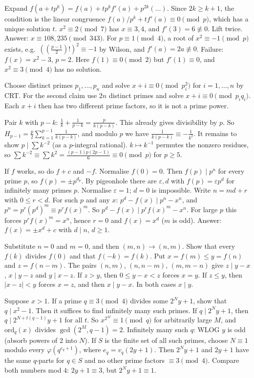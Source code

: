 \documentclass[11pt,a4paper]{article}
\begin{document}
 Expand $f(a+tp^k)=f(a)+tp^kf'(a)+p^{2k}(\dots)$. Since $2k\ge k+1$, the condition is the linear congruence $f(a)/p^k+tf'(a)\equiv0\pmod p$, which has a unique solution $t$.
 $x^2\equiv2\pmod 7$ has $x\equiv3,4$, and $f'(3)=6\not\equiv0$. Lift twice. Answer: $x\equiv108,235\pmod{343}$. For $p\equiv1\pmod 4$, a root of $x^2\equiv-1\pmod p$ exists, e.g.\ $((\frac{p-1}{2})!)^2\equiv-1$ by Wilson, and $f'(a)=2a\not\equiv0$.
 Failure: $f(x)=x^2-3$, $p=2$. Here $f(1)\equiv0\pmod 2$ but $f'(1)\equiv0$, and $x^2\equiv3\pmod 4$ has no solution.

 Choose distinct primes $p_1,\dots,p_n$ and solve $x+i\equiv0\pmod{p_i^2}$ for $i=1,\dots,n$ by CRT.
 For the second claim use $2n$ distinct primes and solve $x+i\equiv0\pmod{p_iq_i}$. Each $x+i$ then has two different prime factors, so it is not a prime power.

 Pair $k$ with $p-k$: $\frac1k+\frac1{p-k}=\frac{p}{k(p-k)}$. This already gives divisibility by $p$.
 So $H_{p-1}=\frac p2\sum_{k=1}^{p-1}\frac1{k(p-k)}$, and modulo $p$ we have $\frac1{k(p-k)}\equiv-\frac1{k^2}$. It remains to show $p\mid\sum k^{-2}$ (as a $p$-integral rational).
 $k\mapsto k^{-1}$ permutes the nonzero residues, so $\sum k^{-2}\equiv\sum k^2=\frac{(p-1)p(2p-1)}6\equiv0\pmod p$ for $p\ge5$.

 If $f$ works, so do $f+c$ and $-f$. Normalise $f(0)=0$. Then $f(p)\mid p^n$ for every prime $p$, so $f(p)=\pm p^{d_p}$.
 By pigeonhole there are $\varepsilon,d$ with $f(p)=\varepsilon p^d$ for infinitely many primes $p$. Normalise $\varepsilon=1$; $d=0$ is impossible. Write $n=md+r$ with $0\le r<d$.
 For such $p$ and any $x$: $p^d-f(x)\mid p^n-x^n$, and $p^n=p^r(p^d)^m\equiv p^rf(x)^m$. So $p^d-f(x)\mid p^rf(x)^m-x^n$. For large $p$ this forces $p^rf(x)^m=x^n$, hence $r=0$ and $f(x)=x^d$ ($m$ is odd). Answer: $f(x)=\pm x^d+c$ with $d\mid n$, $d\ge1$.

 Substitute $n=0$ and $m=0$, and then $(m,n)\to(n,m)$. Show that every $f(k)$ divides $f(0)$ and that $f(-k)=f(k)$.
 Put $x=f(m)\le y=f(n)$ and $z=f(n-m)$. The pairs $(n,m)$, $(n,n-m)$, $(m,m-n)$ give $z\mid y-x$, $x\mid y-z$ and $y\mid x-z$.
 If $z>y$, then $0\le y-x<z$ forces $x=y$. If $z\le y$, then $|x-z|<y$ forces $x=z$, and then $x\mid y-x$. In both cases $x\mid y$.

 Suppose $x>1$. If a prime $q\equiv3\pmod 4$ divides some $2^Ny+1$, show that $q\mid x^2-1$. Then it suffices to find infinitely many such primes.
 If $q\mid 2^Ny+1$, then $q\mid 2^{N+t(q-1)}y+1$ for all $t$. So $x^{2^M}\equiv1\pmod q$ for arbitrarily large $M$, and $\mathrm{ord}_q(x)$ divides $\gcd(2^M,q-1)=2$.
 Infinitely many such $q$: WLOG $y$ is odd (absorb powers of $2$ into $N$). If $S$ is the finite set of all such primes, choose $N\equiv1$ modulo every $\varphi(q^{e_q+1})$, where $e_q=v_q(2y+1)$. Then $2^Ny+1$ and $2y+1$ have the same $q$-parts for $q\in S$ and no other prime factors $\equiv3\pmod 4$. Compare both numbers mod $4$: $2y+1\equiv3$, but $2^Ny+1\equiv1$.
\end{document}
